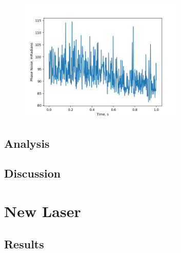 \documentclass[12pt,a4paper,oneside]{report}
\begin{document}
\begin{figure}[H] 
\includegraphics[width=0.7\textwidth, center,angle=0]{DImages/Phase_Noise_for_Scene_shot_2_with_bandwidth___40000_Date_20180323.png}
\caption{}
\label{fig:PN-shot-2-20180323-bw-40000}
\end{figure}




\section{Analysis}

\section{Discussion}


\chapter{New Laser}

\section{Results}
\end{document}
